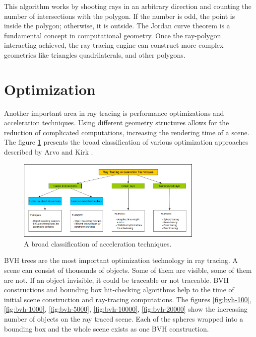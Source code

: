 \documentclass[12pt,a4paper,english]{article}
\begin{document}
This algorithm works by shooting rays in an arbitrary direction and counting the number of intersections with the polygon. If the number is odd, the point is inside the polygon; otherwise, it is outside. The Jordan curve theorem is a fundamental concept in computational geometry. Once the ray-polygon interacting achieved, the ray tracing engine can construct more complex geometries like triangles quadrilaterals, and other polygons.

\newpage
\section{Optimization}

Another important area in ray tracing is performance optimizations and acceleration techniques. Using different geometry structures allows for the reduction of complicated computations, increasing the rendering time of a scene. The figure \ref{fig:acceleration-techniques} presents the broad classification of various optimization approaches described by Arvo and Kirk \cite{Arvo_Kirk_1989}.

\begin{figure}[H]
    \centering
    \includegraphics[width=0.8\textwidth]{acceleration-techniques}
    \caption[]{A broad classification of acceleration techniques.}
    \label{fig:acceleration-techniques}
\end{figure}

BVH trees are the most important optimization technology in ray tracing. A scene can consist of thousands of objects. Some of them are visible, some of them are not. If an object invisible, it could be traceable or not traceable. BVH constructions and bounding box hit-checking algorithms help to the time of initial scene construction and ray-tracing computations. The figures \ref{fig:bvh-100}, \ref{fig:bvh-1000}, \ref{fig:bvh-5000}, \ref{fig:bvh-10000}, \ref{fig:bvh-20000} show the increasing number of objects on the ray traced scene. Each of the spheres wrapped into a bounding box and the whole scene exists as one BVH construction.
\end{document}
